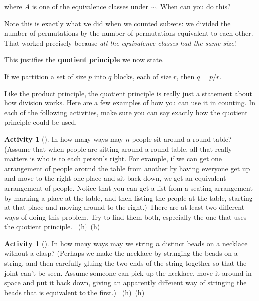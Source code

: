 \documentclass[10pt,]{book}
\newcommand{\terminology}[1]{\textbf{#1}}
\theoremstyle{plain}
\theoremstyle{definition}
\theoremstyle{definition}
\theoremstyle{definition}
\newtheorem{activity}[project]{Activity}
\numberwithin{equation}{chapter}
\begin{document}
where \(A\) is one of the equivalence classes under \(\sim\).  When can you do this?%
\par
\hypertarget{p-758}{}%
Note this is exactly what we did when we counted subsets: we divided the number of permutations by the number of permutations equivalent to each other.  That worked precisely because \emph{all the equivalence classes had the same size}!%
\par
\hypertarget{p-759}{}%
This justifies the \terminology{quotient principle} we now state.%
\begin{assemblage}\label{assemblage-quotientprinciple}
\hypertarget{p-760}{}%
If we partition a set of size \(p\) into \(q\) blocks, each of size \(r\), then \(q = p/r\).%
\end{assemblage}
\hypertarget{p-761}{}%
Like the product principle, the quotient principle is really just a statement about how division works.  Here are a few examples of how you can use it in counting.  In each of the following activities, make sure you can say exactly how the quotient principle could be used.%
\begin{activity}[]\label{roundtable}
\hypertarget{p-762}{}%
In how many ways may \(n\) people sit around a round table? (Assume that when people are sitting around a round table, all that really matters is who is to each person's right. For example, if we can get one arrangement of people around the table from another by having everyone get up and move to the right one place and sit back down, we get an equivalent arrangement of people. Notice that you can get a list from a seating arrangement by marking a place at the table, and then listing the people at the table, starting at that place and moving around to the right.) There are at least two different ways of doing this problem. Try to find them both, especially the one that uses the quotient principle.%
~{\tiny (h)}~{\tiny (h)}\end{activity}
\begin{activity}[]\label{necklace}
\hypertarget{p-766}{}%
In how many ways may we string \(n\) distinct beads on a necklace without a clasp? (Perhaps we make the necklace by stringing the beads on a string, and then carefully gluing the two ends of the string together so that the joint can't be seen. Assume someone can pick up the necklace, move it around in space and put it back down, giving an apparently different way of stringing the beads that is equivalent to the first.)%
~{\tiny (h)}~{\tiny (h)}\end{activity}
\end{document}
